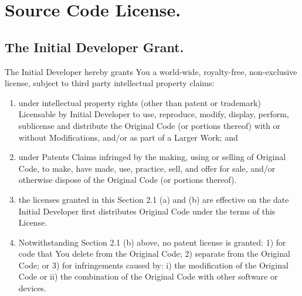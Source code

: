 \documentclass{book}
\begin{document}
\section{Source Code License.}
\subsection{The Initial Developer Grant.}
The Initial Developer hereby grants You a world-wide, royalty-free, non-exclusive license, subject to third party intellectual property claims: 
\renewcommand{\theenumi}{\alph{enumi}}
\begin{enumerate}
\item under intellectual property rights (other than patent or trademark) Licensable by Initial Developer to use, reproduce, modify, display, perform, sublicense and distribute the Original Code (or portions thereof) with or without Modifications, and/or as part of a Larger Work; and 

\item under Patents Claims infringed by the making, using or selling of Original Code, to make, have made, use, practice, sell, and offer for sale, and/or otherwise dispose of the Original Code (or portions thereof). 

\item the licenses granted in this Section 2.1 (a) and (b) are effective on the date Initial Developer first distributes Original Code under the terms of this License. 

\item Notwithstanding Section 2.1 (b) above, no patent license is granted: 1) for code that You delete from the Original Code; 2) separate from the Original Code; or 3) for infringements caused by: i) the modification of the Original Code or ii) the combination of the Original Code with other software or devices. 
\end{enumerate}
\end{document}
